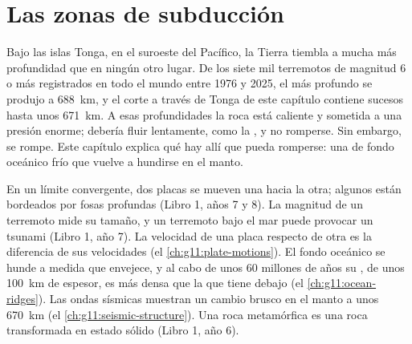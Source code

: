 \chapter{Las zonas de subducción}\label{ch:g11:subduction-zones}

Bajo las islas Tonga, en el suroeste del Pacífico, la Tierra tiembla a mucha
más profundidad que en ningún otro lugar. De los siete mil terremotos de
magnitud 6 o más registrados en todo el mundo entre 1976 y 2025, el más
profundo se produjo a \qty{688}{km}, y el corte a través de Tonga de este capítulo contiene sucesos
hasta unos \qty{671}{km}. A esas profundidades la roca está caliente y
sometida a una presión enorme; debería fluir lentamente, como la ,
y no romperse. Sin embargo, se rompe. Este capítulo explica qué hay allí que
pueda romperse: una  de fondo oceánico frío que vuelve a hundirse en el
manto.

\begin{recall}
En un límite convergente, dos placas se mueven una hacia la otra; algunos
están bordeados por fosas profundas (Libro 1, años 7 y 8). La magnitud de un
terremoto mide su tamaño, y un terremoto bajo el mar puede provocar un
tsunami (Libro 1, año 7). La velocidad de una placa respecto de otra es la
diferencia de sus velocidades (el \cref{ch:g11:plate-motions}). El fondo
oceánico se hunde a medida que envejece, y al cabo de unos 60 millones de
años su , de unos \qty{100}{km} de espesor, es más densa que la
 que tiene debajo (el \cref{ch:g11:ocean-ridges}). Las ondas
sísmicas muestran un cambio brusco en el manto a unos \qty{670}{km} (el
\cref{ch:g11:seismic-structure}). Una roca metamórfica es una roca
transformada en estado sólido (Libro 1, año 6).
\end{recall}


